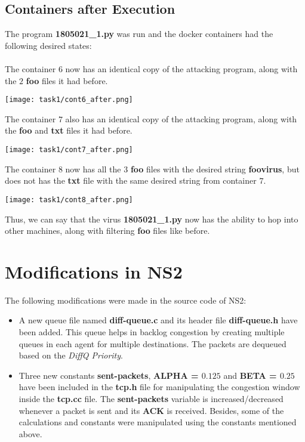 \documentclass{article}
\begin{document}
\subsection{Containers after Execution}
The program \textbf{1805021\_1.py} was run and the docker containers had the following desired states:\\\\

The container $6$ now has an identical copy of the attacking program, along with the $2$ \textbf{foo} files it had before. 
\begin{center}
    \texttt{[image: task1/cont6\_after.png]}
\end{center}

The container $7$ also has an identical copy of the attacking program, along with the \textbf{foo} and \textbf{txt} files it had before. 
\begin{center}
    \texttt{[image: task1/cont7\_after.png]}
\end{center}

The container $8$ now has all the $3$ \textbf{foo} files with the desired string \textbf{foovirus}, but does not has the \textbf{txt} file with the same desired string from container $7$.
\begin{center}
    \texttt{[image: task1/cont8\_after.png]}
\end{center}

Thus, we can say that the virus \textbf{1805021\_1.py} now has the ability to hop into other machines, along with filtering \textbf{foo} files like before.


 \section{Modifications in NS2}
 The following modifications were made in the source code of NS2:
 \begin{itemize}
     \item A new queue file named \textbf{diff-queue.c} and its header file \textbf{diff-queue.h} have been added. This queue helps in backlog congestion by creating multiple queues in each agent for multiple destinations. The packets are dequeued based on the \textit{DiffQ Priority}.
     \item Three new constants \textbf{sent-packets}, \textbf{ALPHA = $0.125$} and \textbf{BETA = $0.25$} have been included in the \textbf{tcp.h} file for manipulating the congestion window inside the \textbf{tcp.cc} file. The \textbf{sent-packets} variable is increased/decreased whenever a packet is sent and its \textbf{ACK} is received. Besides, some of the calculations and constants were manipulated using the constants mentioned above.
 \end{itemize}
\end{document}
